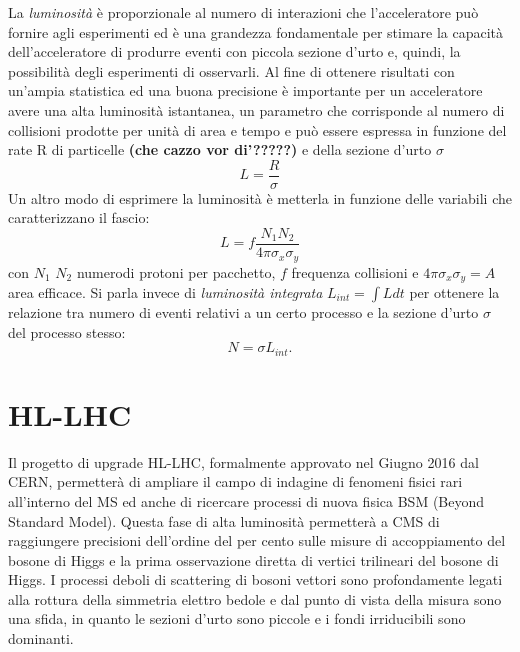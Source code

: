 La {\em luminosit\`a} \`e proporzionale al numero di interazioni che l'acceleratore pu\`o fornire agli esperimenti ed \`e una grandezza fondamentale per stimare la capacit\`a dell'acceleratore di produrre eventi con piccola sezione d'urto e, quindi, la possibilit\`a degli esperimenti di osservarli. Al fine di ottenere risultati con un'ampia statistica ed una buona precisione è importante per un acceleratore avere una alta luminosità istantanea, un parametro che corrisponde al numero di collisioni prodotte per unità di area e tempo e può essere espressa in funzione del rate R di particelle {\bf(che cazzo vor di'?????)} e della sezione d'urto $\sigma$ 
\begin{equation}
L=\frac{R}{\sigma}
\end{equation}
Un altro modo di esprimere la luminosità è metterla in funzione delle variabili che caratterizzano il fascio:
\begin{equation}
L = f \frac{N_1 N_2}{4 \pi \sigma_x \sigma_y}
\end{equation}
con $N_1$ $N_2$ numerodi protoni per pacchetto, $f$ frequenza collisioni e $4\pi \sigma_x \sigma_y =A$ area efficace. Si parla invece di {\em luminosità integrata} $L_{int}=\int L dt$ per ottenere la relazione tra numero di eventi relativi a un certo processo e la sezione d'urto $\sigma$ del processo stesso:
\begin{equation}
N=\sigma L_{int}.
\end{equation}

\section{HL-LHC}
Il progetto di upgrade HL-LHC, formalmente approvato nel Giugno 2016 dal CERN, permetter\`a di ampliare il campo di indagine di fenomeni fisici rari all'interno del MS ed anche di ricercare processi di nuova fisica BSM (Beyond Standard Model). Questa fase di alta luminosità permetterà a CMS di raggiungere precisioni dell'ordine del per cento sulle misure di accoppiamento del bosone di Higgs e la prima osservazione diretta di vertici trilineari del bosone di Higgs. 
I processi deboli di scattering di bosoni vettori sono profondamente legati alla rottura della simmetria elettro bedole e dal punto di vista della misura sono una sfida, in quanto le sezioni d'urto sono piccole e i fondi irriducibili sono dominanti. 

